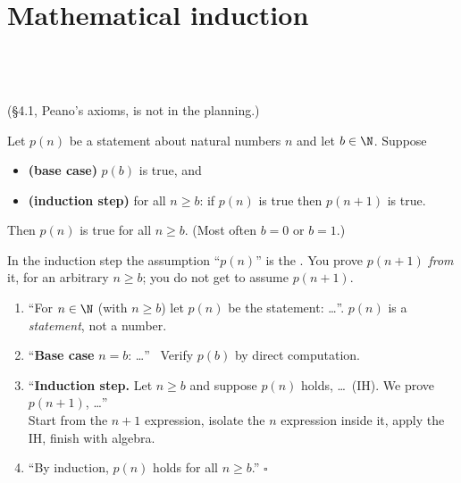 \chapter{Mathematical induction}
%
{\\ \\ \\ (\S4.1, Peano's axioms, is not in the planning.)}


\begin{result}
Let $p(n)$ be a statement about natural numbers $n$ and let $b\in\N$. Suppose
\begin{itemize}
\item \textbf{(base case)} $p(b)$ is true, and
\item \textbf{(induction step)} for all $n\ge b$: if $p(n)$ is true then $p(n+1)$ is true.
\end{itemize}
Then $p(n)$ is true for all $n\ge b$. (Most often $b=0$ or $b=1$.)
\end{result}
In the induction step the assumption ``$p(n)$'' is the . You prove $p(n+1)$ \emph{from} it, for an arbitrary $n\ge b$; you do not get to assume $p(n+1)$.

\begin{strategy}
\begin{enumerate}
\item ``For $n\in\N$ (with $n\ge b$) let $p(n)$ be the statement: \dots''. \quad $p(n)$ is a \emph{statement}, not a number.
\item ``\textbf{Base case} $n=b$: \dots'' \ Verify $p(b)$ by direct computation.
\item ``\textbf{Induction step.} Let $n\ge b$ and suppose $p(n)$ holds, \ie \dots\ (IH). We prove $p(n+1)$, \ie \dots''\\
   Start from the $n+1$ expression, isolate the $n$ expression inside it, apply the IH, finish with algebra.
\item ``By induction, $p(n)$ holds for all $n\ge b$.'' $\square$
\end{enumerate}
\end{strategy}

